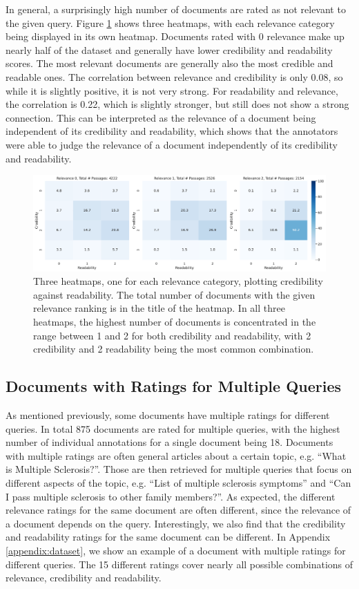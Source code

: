 In general, a surprisingly high number of documents are rated as not relevant to the given query.
Figure \ref{fig:heatmap_rel_cred_read} shows three heatmaps, with each relevance category being displayed in its own heatmap.
Documents rated with 0 relevance make up nearly half of the dataset and generally have lower credibility and readability scores.
The most relevant documents are generally also the most credible and readable ones.
The correlation between relevance and credibility is only 0.08, so while it is slightly positive, it is not very strong.
For readability and relevance, the correlation is 0.22, which is slightly stronger, but still does not show a strong connection.
This can be interpreted as the relevance of a document being independent of its credibility and readability, which shows that the annotators were able to judge the relevance of a document independently of its credibility and readability.
\begin{figure}
\centering
\includegraphics[width=\textwidth]{images/heatmap_qrels.pdf}
\caption{Three heatmaps, one for each relevance category, plotting credibility against readability.
The total number of documents with the given relevance ranking is in the title of the heatmap.
In all three heatmaps, the highest number of documents is concentrated in the range between 1 and 2 for both credibility and readability, with 2 credibility and 2 readability being the most common combination.
}
\label{fig:heatmap_rel_cred_read}
\end{figure}

\subsection{Documents with Ratings for Multiple Queries}
As mentioned previously, some documents have multiple ratings for different queries.
In total 875 documents are rated for multiple queries, with the highest number of individual annotations for a single document being 18.
Documents with multiple ratings are often general articles about a certain topic, e.g. ``What is Multiple Sclerosis?''.
Those are then retrieved for multiple queries that focus on different aspects of the topic, e.g. ``List of multiple sclerosis symptoms'' and ``Can I pass multiple sclerosis to other family members?''.
As expected, the different relevance ratings for the same document are often different, since the relevance of a document depends on the query.
Interestingly, we also find that the credibility and readability ratings for the same document can be different.
In Appendix \ref{appendix:dataset}, we show an example of a document with multiple ratings for different queries.
The 15 different ratings cover nearly all possible combinations of relevance, credibility and readability.

